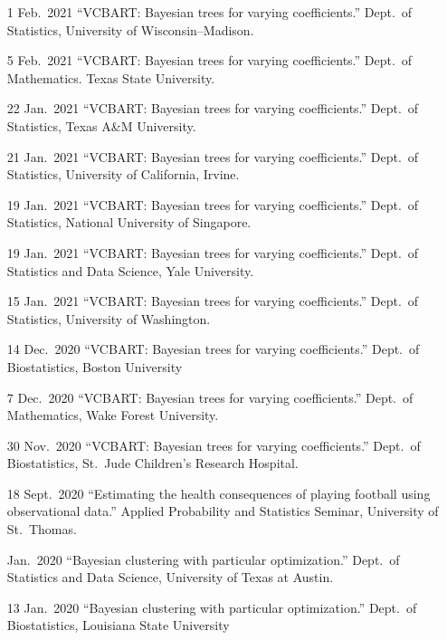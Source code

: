 \documentclass[margin]{res}
\begin{document}
\begin{resume}
{\begin{itemize}
\item[1 Feb.~2021]{``VCBART: Bayesian trees for varying coefficients.'' Dept.~of Statistics, University of Wisconsin--Madison.}

\item[5 Feb.~2021]{``VCBART: Bayesian trees for varying coefficients.'' Dept.~of Mathematics. Texas State University.}

\item[22 Jan.~2021]{``VCBART: Bayesian trees for varying coefficients.'' Dept.~of Statistics, Texas A\&M University.}

\item[21 Jan.~2021]{``VCBART: Bayesian trees for varying coefficients.'' Dept.~of Statistics, University of California, Irvine.}

\item[19 Jan.~2021]{``VCBART: Bayesian trees for varying coefficients.'' Dept.~of Statistics, National University of Singapore.}

\item[19 Jan.~2021]{``VCBART: Bayesian trees for varying coefficients.'' Dept.~of Statistics and Data Science, Yale University.}

\item[15 Jan.~2021]{``VCBART: Bayesian trees for varying coefficients.'' Dept.~of Statistics, University of Washington.}

\item[14 Dec.~2020]{``VCBART: Bayesian trees for varying coefficients.'' Dept.~of Biostatistics, Boston University}

\item[7 Dec.~2020]{``VCBART: Bayesian trees for varying coefficients.'' Dept.~of Mathematics, Wake Forest University.}

\item[30 Nov.~2020]{``VCBART: Bayesian trees for varying coefficients.'' Dept.~of Biostatistics, St.~Jude Children's Research Hospital.}

\item[18 Sept.~2020]{``Estimating the health consequences of playing football using observational data.'' Applied Probability and Statistics Seminar, University of St.~Thomas.} 

\item[Jan.~2020]{``Bayesian clustering with particular optimization.'' Dept.~of Statistics and Data Science, University of Texas at Austin.}

\item[13 Jan.~2020]{``Bayesian clustering with particular optimization.'' Dept.~of Biostatistics, Louisiana State University}
\end{itemize}
}

\end{resume}
\end{document}
